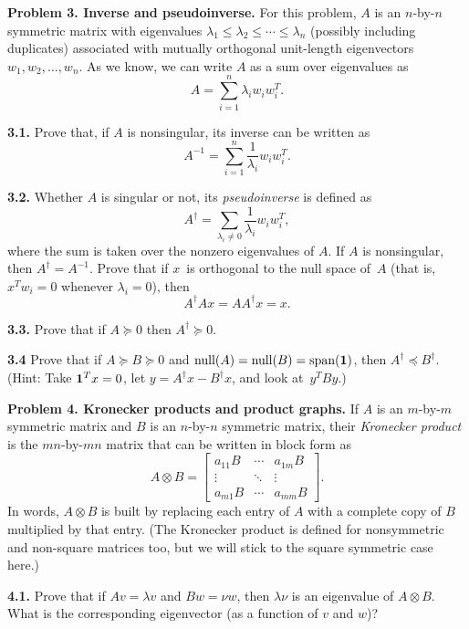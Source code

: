 \documentclass[11pt]{article}
\newcommand{\m}[1]{{\bf{#1}}}       %
\newcommand{\ones}{\m1}             %
\newcommand{\pinv}{^{\dagger}}      %
\begin{document}
\par\bigskip
{\bf Problem 3. Inverse and pseudoinverse.}
For this problem, $A$ is an $n$-by-$n$ symmetric matrix with eigenvalues
$\lambda_1\leq\lambda_2\leq\cdots\leq\lambda_n$ 
(possibly including duplicates) 
associated with mutually orthogonal unit-length eigenvectors
$w_1, w_2, \ldots, w_n$.  
As we know, we can write $A$ as a sum over eigenvalues as
$$A = \sum_{i=1}^n \lambda_i w_iw_i^T.$$

\par\medskip
{\bf 3.1.} 
Prove that, if $A$ is nonsingular, its inverse can be written as
$$A^{-1} = \sum_{i=1}^n \frac{1}{\lambda_i} w_iw_i^T.$$

\par\medskip
{\bf 3.2.} 
Whether $A$ is singular or not, its {\em pseudoinverse} is defined as
$$A\pinv = \sum_{\lambda_i\ne 0} \frac{1}{\lambda_i} w_iw_i^T,$$
where the sum is taken over the nonzero eigenvalues of $A$.
If $A$ is nonsingular, then $A\pinv=A^{-1}$.
Prove that if $x$~is orthogonal to the null space of~$A$
(that is, $x^Tw_i=0$ whenever $\lambda_i=0$), then
$$A\pinv A x = AA\pinv x = x.$$

\par\medskip
{\bf 3.3.}
Prove that if $A\succeq 0$ then $A\pinv\succeq 0$.

\par\medskip
{\bf 3.4}
Prove that if $A\succeq B\succeq 0$ and 
$\mbox{null}(A)=\mbox{null}(B)=\mbox{span}(\ones)$,
then $A\pinv \preceq B\pinv$.
(Hint: Take $\ones^T x=0$, let $y=A\pinv x-B\pinv x$, and look at~$y^TBy$.)

\par\bigskip
{\bf Problem 4. Kronecker products and product graphs.}
If $A$ is an $m$-by-$m$ symmetric matrix and $B$ is an $n$-by-$n$ symmetric matrix,
their {\em Kronecker product} is the $mn$-by-$mn$ matrix that
can be written in block form as
$$
A\otimes B = \begin{bmatrix}
  a_{11} B & \cdots & a_{1m} B \\
  \vdots   & \ddots & \vdots   \\
  a_{m1} B & \cdots & a_{mm} B
\end{bmatrix}.
$$
In words, $A\otimes B$ is built by replacing each entry of $A$ with a complete copy of $B$
multiplied by that entry.
(The Kronecker product is defined for nonsymmetric and non-square matrices too,
but we will stick to the square symmetric case here.)

\par\medskip
{\bf 4.1.}
Prove that if $Av=\lambda v$ and $Bw=\nu w$, then $\lambda\nu$ is an eigenvalue 
of $A\otimes B$. What is the corresponding eigenvector (as a function of $v$ and $w$)?
\end{document}
